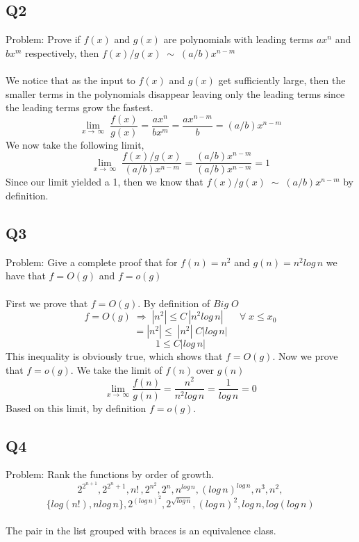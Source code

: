 \documentclass[12pt, oneside]{article}
\begin{document}
\subsection*{Q2}
Problem: Prove if $f(x)$ and $g(x)$ are polynomials with leading terms $ax^{n}$ and $bx^{m}$ respectively, then $f(x)/g(x)\;\sim\;(a/b)x^{n-m}$
\\\\
We notice that as the input to $f(x)$ and $g(x)$ get sufficiently large, then the smaller terms in the polynomials disappear leaving only the leading terms since the leading terms grow the fastest.
\\
\[\lim\limits_{x\rightarrow\,\infty}\;\frac{f(x)}{g(x)} = \frac{ax^{n}}{bx^{m}} = \frac{ax^{n-m}}{b} = (a/b)x^{n-m}\]
We now take the following limit,
\[\lim\limits_{x\rightarrow\,\infty}\;\frac{f(x)/g(x)}{(a/b)x^{n-m}} =  \frac{(a/b)x^{n-m}}{(a/b)x^{n-m}} = 1\]
Since our limit yielded a 1, then we know that $f(x)/g(x)\;\sim\;(a/b)x^{n-m}$ by definition.
\\
\subsection*{Q3}
Problem: Give a complete proof that for $f(n)=n^{2}$ and $g(n)=n ^{2}log\,n$ we have that $f=O(g)$ and $f=o(g)$
\\\\
First we prove that $f=O(g)$. By definition of $Big\;O$
\[f=O(g)\;\Longrightarrow\;|n^{2}| \leq C\,|n^{2}log\,n|\;\;\;\;\;\;\forall\; x\leq x_{0}\]
\[ = |n^{2}| \leq\;|n^{2}|\; C|log\,n|\]
\[1 \leq C|log\,n|\] 
This inequality is obviously true, which shows that $f=O(g)$. Now we prove that $f=o(g)$. We take the limit of $f(n)$ over $g(n)$
\[\lim\limits_{x\rightarrow\,\infty} \frac{f(n)}{g(n)} = \frac{n^{2}}{n^{2}log\,n} = \frac{1}{log\,n} = 0\]
Based on this limit, by definition $f=o(g)$.
\\
\subsection*{Q4}
Problem: Rank the functions by order of growth.
\\
\[2^{2^{n+1}}, 2^{2^{n}+1}, n!\,, 2^{n^{2}}, 2^{n}, n^{log\,n}, (log\,n)^{log\,n}, n^{3}, n^{2},\] 
\[\{log(n!), nlog\,n\},2^{(log\,n)^{2}}, 2^{\sqrt{log\,n}}, (log\,n)^{2}, log\,n, log(log\,n) \]
\\
The pair in the list grouped with braces is an equivalence class.
\end{document}
